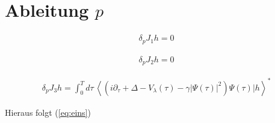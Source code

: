 \documentclass[10pt,a4paper]{article}
\newcommand{\iu}{\ensuremath{i}}
\newcommand{\intT}{\ensuremath{\int_0^T d\tau\,}}
\newcommand{\skalarprodukt}[2]{\left< #1 \vert #2 \right>}
\begin{document}
\section{Ableitung $p$}

\begin{align}
\delta_{p} J_1 h = 0
\end{align}

\begin{align}
\delta_{p} J_2 h = 0
\end{align}

\begin{align}
\delta_{p} J_3 h = \intT \skalarprodukt{\left( \iu \partial_{\tau} + \Delta - V_{\lambda}(\tau) - \gamma \vert \Psi(\tau) \vert^2 \right)\Psi(\tau)}{h}^*
\end{align}

Hieraus folgt (\ref{eq:eins})
\end{document}
